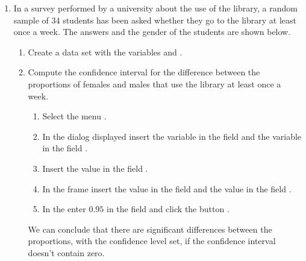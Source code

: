 \begin{enumerate}[leftmargin=*]
\item In a survey performed by a university about the use of the library, a random sample of 34 students has been asked
whether they go to the library at least once a week.
The answers and the gender of the students are shown below. 
\begin{center}
\end{center}

\begin{enumerate}
\item Create a data set with the variables  and .
\item Compute the confidence interval for the difference between the proportions of females and males that use the
library at least once a week.
\begin{indication}
\begin{enumerate}
\item Select the menu .
\item In the dialog displayed insert the variable  in the field  and 
the variable  in the field .
\item Insert the value  in the field .
\item In the frame  insert the value  in the field  and the value  in the field .
\item In the  enter $0.95$ in the field  and click the button
.
\end{enumerate}
We can conclude that there are significant differences between the proportions, with the confidence level set, if the
confidence interval doesn't contain zero. 
\end{indication}
\end{enumerate}


\end{enumerate}
